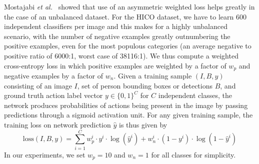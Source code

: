 \documentclass[runningheads]{llncs}
\begin{document}
Mostajabi \emph{et al.}~\cite{mostajabi2015feedforward} showed that use of an asymmetric weighted loss helps greatly in the case of an unbalanced dataset. For the HICO dataset, we have to learn 600 independent classifiers per image and this makes for a highly unbalanced scenario, with the number of negative examples greatly outnumbering the positive examples, even for the most populous categories (an average negative to positive ratio of 6000:1, worst case of 38116:1). We thus compute a weighted cross-entropy loss in which positive examples are weighted by a factor of $w_p$ and negative examples by a factor of $w_n$. Given a training sample $(I, B, y)$ consisting of an image $I$, set of person bounding boxes or detections $B$, and ground truth action label vector $y\in\{0,1\}^C$ for $C$ independent classes, the network produces probabilities of actions being present in the image by passing predictions through a sigmoid activation unit. For any given training sample, the training loss on network prediction $\hat{y}$ is thus given by
\begin{equation}
	\text{loss}(I, B, y) = \sum_{i=1}^{C}  w_p^i \cdot y^i \cdot \log(\hat{y}^i) + w_n^i \cdot (1-y^i) \cdot \log(1-\hat{y}^i)
\end{equation}
In our experiments, we set $w_p=10$ and $w_n=1$ for all classes for simplicity.
\end{document}
